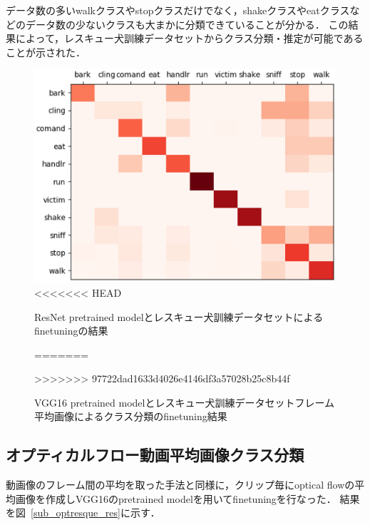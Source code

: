 データ数の多いwalkクラスやstopクラスだけでなく，shakeクラスやeatクラスなどのデータ数の少ないクラスも大まかに分類できていることが分かる．
この結果によって，レスキュー犬訓練データセットからクラス分類・推定が可能であることが示された．
\begin{figure}[htbp]
  \begin{center}
    \includegraphics[scale=0.5]{./Figures/resque_mean_result.eps}
<<<<<<< HEAD
    \caption{ResNet pretrained modelとレスキュー犬訓練データセットによるfinetuningの結果}
=======
    \caption{VGG16 pretrained modelとレスキュー犬訓練データセットフレーム平均画像によるクラス分類のfinetuning結果}
>>>>>>> 97722dad1633d4026e4146df3a57028b25c8b44f
    \label{sub_resque_res}
  \end{center}
\end{figure}

\subsection{オプティカルフロー動画平均画像クラス分類}
動画像のフレーム間の平均を取った手法と同様に，クリップ毎にoptical flowの平均画像を作成しVGG16のpretrained modelを用いてfinetuningを行なった．
結果を図~\ref{sub_optresque_res}に示す．

